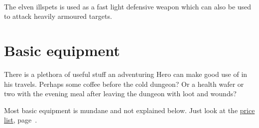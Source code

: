 \

The elven illspets is used as a fast light defensive weapon which can also be used to attack heavily armoured targets.











\section*{Basic equipment}

There is a plethora of useful stuff an adventuring Hero can make good use of in his travels. Perhaps some coffee before the cold dungeon? Or a health wafer or two with the evening meal after leaving the dungeon with loot and wounds?

Most basic equipment is mundane and not explained below. Just look at the \hyperref[sec:basicequipmentpricelist]{price list}, page~\pageref{sec:basicequipmentpricelist}.

\

